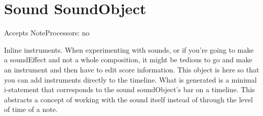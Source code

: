 \section{Sound SoundObject}\label{sound}

Accepts NoteProcessors: no

Inline instruments. When experimenting with sounds, or if you're going
to make a soundEffect and not a whole composition, it might be tedious
to go and make an instrument and then have to edit score information.
This object is here so that you can add instruments directly to the
timeline. What is generated is a minimal i-statement that corresponds to
the sound soundObject's bar on a timeline. This abstracts a concept of
working with the sound itself instead of through the level of time of a
note.
